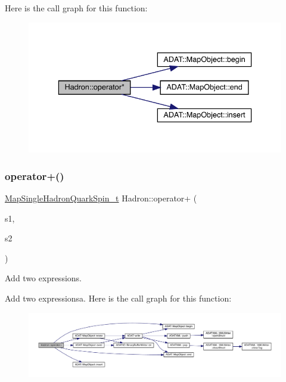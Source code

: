 Here is the call graph for this function\+:\nopagebreak
\begin{figure}[H]
\begin{center}
\leavevmode
\includegraphics[width=336pt]{d1/daf/namespaceHadron_afeecee88605be038ceda273e796e53fd_cgraph}
\end{center}
\end{figure}
\mbox{\label{namespaceHadron_a9ca80acd77b748f912b330709f8c294a}} 
\subsubsection{\texorpdfstring{operator+()}{operator+()}\hspace{0.1cm}{\footnotesize\ttfamily [1/3]}}
{\footnotesize\ttfamily \mbox{\hyperlink{namespaceHadron_a22279e56b59508dc8dd2c8991dc911fd}{Map\+Single\+Hadron\+Quark\+Spin\+\_\+t}} Hadron\+::operator+ (\begin{DoxyParamCaption}\item[{const \mbox{\hyperlink{namespaceHadron_a22279e56b59508dc8dd2c8991dc911fd}{Map\+Single\+Hadron\+Quark\+Spin\+\_\+t}} \&}]{s1,  }\item[{const \mbox{\hyperlink{namespaceHadron_a22279e56b59508dc8dd2c8991dc911fd}{Map\+Single\+Hadron\+Quark\+Spin\+\_\+t}} \&}]{s2 }\end{DoxyParamCaption})}



Add two expressions. 

Add two expressionsa. Here is the call graph for this function\+:\nopagebreak
\begin{figure}[H]
\begin{center}
\leavevmode
\includegraphics[width=350pt]{d1/daf/namespaceHadron_a9ca80acd77b748f912b330709f8c294a_cgraph}
\end{center}
\end{figure}
\mbox{\label{namespaceHadron_afa83538fb097946f87e6f98180c378b5}} 
